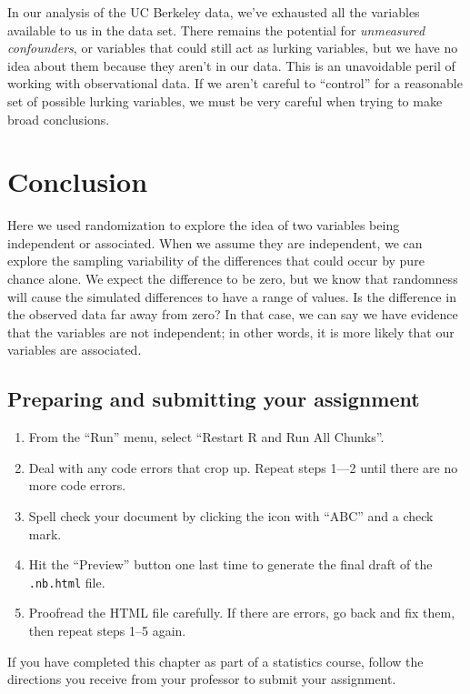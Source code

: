 \documentclass[
]{book}
\providecommand{\tightlist}{%
  \setlength{\itemsep}{0pt}\setlength{\parskip}{0pt}}
\begin{document}
In our analysis of the UC Berkeley data, we've exhausted all the variables available to us in the data set. There remains the potential for \emph{unmeasured confounders}, or variables that could still act as lurking variables, but we have no idea about them because they aren't in our data. This is an unavoidable peril of working with observational data. If we aren't careful to ``control'' for a reasonable set of possible lurking variables, we must be very careful when trying to make broad conclusions.

\hypertarget{randomization2-conclusion}{%
\section{Conclusion}\label{randomization2-conclusion}}

Here we used randomization to explore the idea of two variables being independent or associated. When we assume they are independent, we can explore the sampling variability of the differences that could occur by pure chance alone. We expect the difference to be zero, but we know that randomness will cause the simulated differences to have a range of values. Is the difference in the observed data far away from zero? In that case, we can say we have evidence that the variables are not independent; in other words, it is more likely that our variables are associated.

\hypertarget{randomization2-prep}{%
\subsection{Preparing and submitting your assignment}\label{randomization2-prep}}

\begin{enumerate}
\def\labelenumi{\arabic{enumi}.}
\tightlist
\item
  From the ``Run'' menu, select ``Restart R and Run All Chunks''.
\item
  Deal with any code errors that crop up. Repeat steps 1---2 until there are no more code errors.
\item
  Spell check your document by clicking the icon with ``ABC'' and a check mark.
\item
  Hit the ``Preview'' button one last time to generate the final draft of the \texttt{.nb.html} file.
\item
  Proofread the HTML file carefully. If there are errors, go back and fix them, then repeat steps 1--5 again.
\end{enumerate}

If you have completed this chapter as part of a statistics course, follow the directions you receive from your professor to submit your assignment.

  
\end{document}
